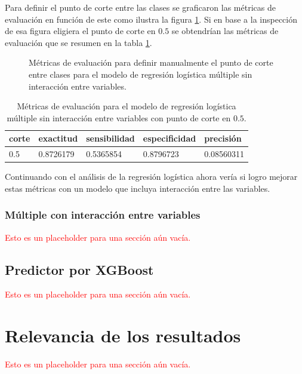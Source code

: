 \documentclass[a4paper]{report}
\begin{document}
Para definir el punto de corte entre las clases se graficaron las métricas de evaluación en función de este como ilustra la figura \ref{fig:múltiple_metrics}.
Si en base a la inspección de esa figura eligiera el punto de corte en \(0.5\) se obtendrían las métricas de evaluación que se resumen en la tabla \ref{tab:múltiple_metrics}.

\begin{figure}[!ht]
	\centering
	
	\caption{Métricas de evaluación para definir manualmente el punto de corte entre clases para el modelo de regresión logística múltiple sin interacción entre variables.}
	\label{fig:múltiple_metrics}
\end{figure}

\begin{table}[h]
\centering
\begin{tabular}{lllll}
\toprule
corte & exactitud & sensibilidad & especificidad & precisión \\
\midrule
\num{0.5} & \num{0.8726179} & \num{0.5365854} & \num{0.8796723} & \num{0.08560311} \\
\bottomrule
\end{tabular}
\caption{Métricas de evaluación para el modelo de regresión logística múltiple sin interacción entre variables con punto de corte en \(0.5\).}
\label{tab:múltiple_metrics}
\end{table}


Continuando con el análisis de la regresión logística ahora vería si logro mejorar estas métricas con un modelo que incluya interacción entre las variables.

\subsubsection{Múltiple con interacción entre variables}
\textcolor{red}{Esto es un placeholder para una sección aún vacía.}


\subsection{Predictor por XGBoost}
\textcolor{red}{Esto es un placeholder para una sección aún vacía.}



\section{Relevancia de los resultados}
\textcolor{red}{Esto es un placeholder para una sección aún vacía.}
\end{document}
